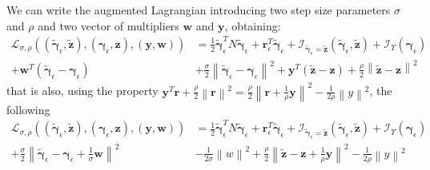 \documentclass{svproc}
\newcommand{\vect}[1]{\bm{#1}}
\newcommand{\norm}[1]{\left\lVert#1\right\rVert}
\begin{document}
We can write the augmented Lagrangian introducing two step size parameters $\sigma$ and $\rho$ and two vector of multipliers $\vect{w}$ and $\vect{y}$, obtaining:
\begin{align}
\mathcal{L}_{\sigma,\rho} \left((\tilde{\vect{\gamma}}_\epsilon,\tilde{\vect{z}}),(\vect{\gamma}_\epsilon,\vect{z}),(\vect{y},\vect{w})\right) &= 
\frac{1}{2} \tilde{\vect{\gamma}}_\epsilon^T N \tilde{\vect{\gamma}}_\epsilon + \vect{r}^T_\epsilon \tilde{\vect{\gamma}}_\epsilon  
+  \mathcal{I}_{\tilde{\vect{\gamma}}_\epsilon = \tilde{\vect{z}}}(\tilde{\vect{\gamma}}_\epsilon,\tilde{\vect{z}}) 
+  \mathcal{I}_\Upsilon(\vect{\gamma}_\epsilon) \nonumber \\
+ \vect{w}^T (\tilde{\vect{\gamma}}_\epsilon - \vect{\gamma}_\epsilon) 
&+ \frac{\sigma}{2} \norm{\tilde{\vect{\gamma}}_\epsilon - \vect{\gamma}_\epsilon}^2
+ \vect{y}^T (\tilde{\vect{z}} - \vect{z}) 
+ \frac{\rho}{2} \norm{\tilde{\vect{z}} - \vect{z}}^2
\end{align}
that is also, using the property $\vect{y}^T\vect{r} + \frac{\rho}{2}\norm{\vect{r}}^2 = \frac{\rho}{2}\norm{\vect{r}+\frac{1}{\rho} \vect{y}}^2 - \frac{1}{2\rho} \norm{y}^2$, the following
\begin{align}
\mathcal{L}_{\sigma,\rho} \left((\tilde{\vect{\gamma}}_\epsilon,\tilde{\vect{z}}),(\vect{\gamma}_\epsilon,\vect{z}),(\vect{y},\vect{w})\right) &= 
\frac{1}{2} \tilde{\vect{\gamma}}_\epsilon^T N \tilde{\vect{\gamma}}_\epsilon + \vect{r}^T_\epsilon \tilde{\vect{\gamma}}_\epsilon  
+  \mathcal{I}_{\tilde{\vect{\gamma}}_\epsilon = \tilde{\vect{z}}}(\tilde{\vect{\gamma}}_\epsilon,\tilde{\vect{z}}) 
+  \mathcal{I}_\Upsilon(\vect{\gamma}_\epsilon) \nonumber \\
+ \frac{\sigma}{2} \norm{\tilde{\vect{\gamma}}_\epsilon - \vect{\gamma}_\epsilon + \frac{1}{\sigma} \vect{w}}^2 
&- \frac{1}{2\sigma} \norm{w}^2
+ \frac{\rho}{2} \norm{\tilde{\vect{z}} - \vect{z} + \frac{1}{\rho} \vect{y}}^2
- \frac{1}{2\rho} \norm{y}^2
\end{align}
\end{document}
